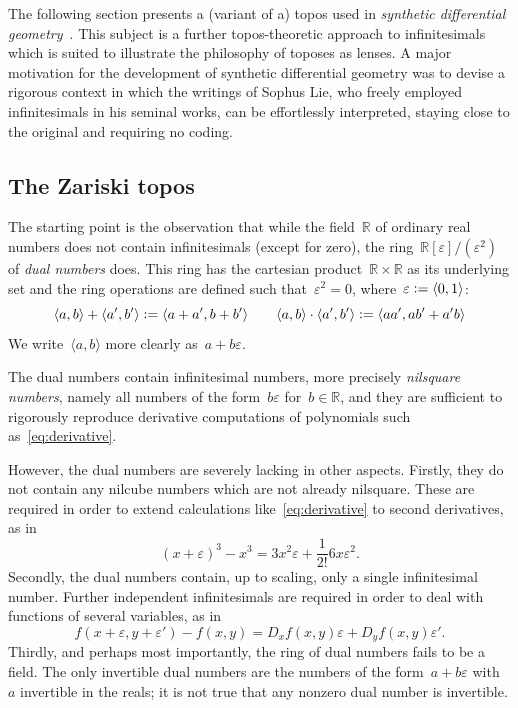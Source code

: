 \documentclass[oneside,reqno]{amsart}
\theoremstyle{definition}
\theoremstyle{plain}
\theoremstyle{remark}
\newcommand{\RR}{\mathbb{R}}
\newcommand{\defeq}{\vcentcolon=}
\renewcommand{\_}{\mathpunct{.}\,}
\newcommand{\?}{\,{:}\,}
\begin{document}
The following section presents a (variant of a) topos used in \emph{synthetic differential
geometry}~\cite{kock:sdg,kock:new-methods}. This subject is a further topos-theoretic
approach to infinitesimals which is suited to illustrate the philosophy of toposes
as lenses. A major motivation for the development of synthetic differential
geometry was to devise a rigorous context in which the
writings of Sophus Lie, who freely employed infinitesimals in his seminal
works, can be effortlessly interpreted, staying close to the
original and requiring no coding.


\subsection{The Zariski topos} The starting point is the observation that
while the field~$\RR$ of ordinary real numbers does not contain infinitesimals
(except for zero), the ring~$\RR[\varepsilon]/(\varepsilon^2)$ of \emph{dual
numbers} does. This ring has the cartesian product~$\RR \times \RR$ as its
underlying set and the ring operations are defined such
that~$\varepsilon^2 = 0$, where~$\varepsilon \defeq \langle 0,1 \rangle$:
\[
  \langle a,b \rangle + \langle a',b' \rangle \defeq
  \langle a+a', b+b' \rangle \qquad
  \langle a,b \rangle \cdot \langle a',b' \rangle \defeq
  \langle aa', ab'+a'b \rangle
\]
We write~$\langle a,b \rangle$ more clearly
as~$a+b\varepsilon$.

The dual numbers contain infinitesimal numbers, more precisely \emph{nilsquare
numbers}, namely all numbers of the form~$b \varepsilon$ for~$b \in \RR$, and
they are sufficient to rigorously reproduce derivative computations of
polynomials such as~\eqref{eq:derivative}.

However, the dual numbers are severely lacking in other aspects. Firstly, they
do not contain any nilcube numbers which are not already nilsquare. These are
required in order to extend calculations like~\eqref{eq:derivative} to second
derivatives, as in
\[ (x+\varepsilon)^3 - x^3 = 3x^2\varepsilon + \frac{1}{2!} 6x
\varepsilon^2. \]
Secondly, the dual numbers contain, up to scaling, only a single infinitesimal
number. Further independent infinitesimals are required in order to deal with
functions of several variables, as in
\[ f(x+\varepsilon,y+\varepsilon') - f(x,y) = D_xf(x,y)\varepsilon +
D_yf(x,y)\varepsilon'. \]
Thirdly, and perhaps most importantly, the ring of dual numbers fails to be a
field. The only invertible dual numbers are the numbers of the form~$a +
b\varepsilon$ with~$a$ invertible in the reals; it is not true that any nonzero
dual number is invertible.
\end{document}
